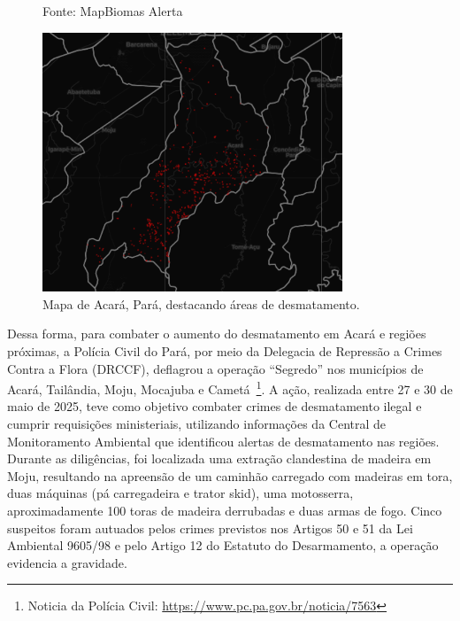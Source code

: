 \documentclass[12pt, a4paper, onecolumn, notitlepage]{article}
\begin{document}
    \begin{figure}[htbp]
        \centering
        \caption*{Fonte: MapBiomas Alerta}
        \includegraphics[width=0.8\textwidth]{figures/mapa_acara.png}
        \caption{Mapa de Acará, Pará, destacando áreas de desmatamento.}
        \label{fig:mapa_acara}
    \end{figure}

    Dessa forma, para combater o aumento do desmatamento em Acará e regiões próximas, a Polícia Civil do Pará, por meio da Delegacia de Repressão a Crimes Contra a Flora (DRCCF), deflagrou a operação ``Segredo'' nos municípios de Acará, Tailândia, Moju, Mocajuba e Cametá~\footnote{Noticia da Polícia Civil: \url{https://www.pc.pa.gov.br/noticia/7563}}. A ação, realizada entre 27 e 30 de maio de 2025, teve como objetivo combater crimes de desmatamento ilegal e cumprir requisições ministeriais, utilizando informações da Central de Monitoramento Ambiental que identificou alertas de desmatamento nas regiões. Durante as diligências, foi localizada uma extração clandestina de madeira em Moju, resultando na apreensão de um caminhão carregado com madeiras em tora, duas máquinas (pá carregadeira e trator skid), uma motosserra, aproximadamente 100 toras de madeira derrubadas e duas armas de fogo. Cinco suspeitos foram autuados pelos crimes previstos nos Artigos 50 e 51 da Lei Ambiental 9605/98 e pelo Artigo 12 do Estatuto do Desarmamento, a operação evidencia a gravidade.
\end{document}
